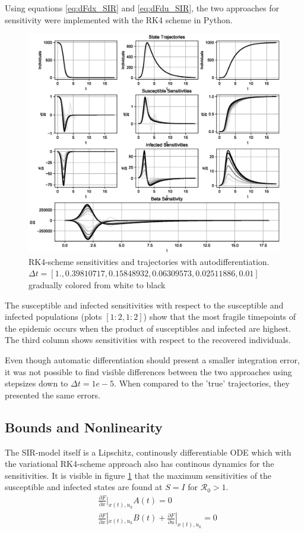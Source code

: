 Using equations \ref{eq:dFdx_SIR} and \ref{eq:dFdu_SIR}, the two approaches for sensitivity were implemented with the RK4 scheme in Python.

\begin{figure}[h]
    \centering
    \includegraphics[width=.9\linewidth]{Figures/Autodiff_Sensitivities.eps}
    \caption{RK4-scheme sensitivities and trajectories with autodifferentiation. $\Delta t = [1.        , 0.39810717, 0.15848932, 0.06309573, 0.02511886,
       0.01      ]$ gradually colored from white to black}
    \label{fig:RK4_Autodiff}
\end{figure}

The susceptible and infected sensitivities with respect to the susceptible and infected populations (plots $[1:2,1:2]$) show that the most fragile timepoints of the epidemic occurs when the product of susceptibles and infected are highest. The third column shows sensitivities with respect to the recovered individuals.

Even though automatic differentiation should present a smaller integration error, it was not possible to find visible differences between the two approaches using stepsizes down to $\Delta t = 1e-5$. When compared to the 'true' trajectories, they presented the same errors.
\newpage
\subsection{Bounds and Nonlinearity}
The SIR-model itself is a Lipschitz, continously differentiable ODE which with the variational RK4-scheme approach also has continous dynamics for the sensitivities. It is visible in figure \ref{fig:RK4_Autodiff} that the maximum sensitivities of the susceptible and infected states are found at $S = I$ for $\mathscr{R}_0 > 1$.
\iffalse
\begin{align}
        &\frac{\partial F}{\partial x}|_{x(t),u_k} A(t) = 0\\
 &\frac{\partial F}{\partial x}|_{x(t), u_k} B(t) + \frac{\partial F}{\partial u}|_{x(t), u_k} = 0
\end{align}

